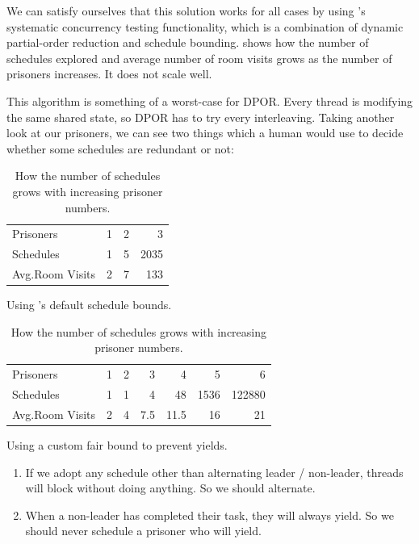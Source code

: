 We can satisfy ourselves that this solution works for all cases by
using \dejafu{}'s systematic concurrency testing functionality, which
is a combination of dynamic partial-order reduction and schedule
bounding.   shows how the number of schedules
explored and average number of room visits grows as the number of
prisoners increases.  It does not scale well.

This algorithm is something of a worst-case for DPOR.  Every thread is
modifying the same shared state, so DPOR has to try every
interleaving.  Taking another look at our prisoners, we can see two
things which a human would use to decide whether some schedules are
redundant or not:

\begin{table}
\begin{subtable}{\textwidth}
  \centering
  \begin{tabular}{lrrr} \toprule
    Prisoners          & 1 & 2 &    3 \\
    Schedules          & 1 & 5 & 2035 \\
    Avg.\@ Room Visits & 2 & 7 &  133 \\ \bottomrule
  \end{tabular}
  \caption{Using \dejafu{}'s default schedule bounds.}\label{tbl:100slow}
\end{subtable}

\vspace{1.5em}

\begin{subtable}{\textwidth}
  \centering
  \begin{tabular}{lrrrrrr} \toprule
    Prisoners          & 1 & 2 & 3   &  4   &    5 &      6 \\
    Schedules          & 1 & 1 & 4   & 48   & 1536 & 122880 \\
    Avg.\@ Room Visits & 2 & 4 & 7.5 & 11.5 &   16 &     21 \\ \bottomrule
  \end{tabular}
  \caption{Using a custom fair bound to prevent yields.}\label{tbl:100fast}
\end{subtable}
\caption{How the number of schedules grows with increasing prisoner numbers.}\label{tbl:100slowfast}
\end{table}

\begin{enumerate}
\item If we adopt any schedule other than alternating leader /
  non-leader, threads will block without doing anything.  So we should
  alternate.
\item When a non-leader has completed their task, they will always
  yield.  So we should never schedule a prisoner who will yield.
\end{enumerate}

